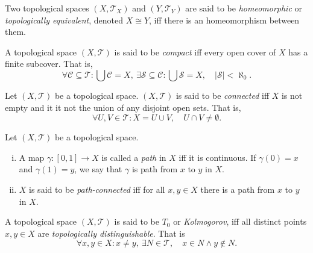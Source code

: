 \begin{definition}
	[Homeomorphic]
	\label{def: homomorphisms}
	Two topological spaces $(X, \mathcal T_X)$ and $(Y, \mathcal T_Y)$ are said to be \textit{homeomorphic} or \textit{topologically equivalent}, denoted $X \cong Y$, iff there is an homeomorphism between them.
\end{definition}


\begin{definition}
	[Compactness]
	\label{def: compactness}
	A topological space $(X, \mathcal T)$ is said to be \textit{compact} iff every open cover of $X$ has a finite subcover. That is,
	$$
	\forall \mathcal C \subseteq \mathcal T : \bigcup \mathcal C = X, \ \exists \mathcal S \subseteq \mathcal C : \bigcup \mathcal S = X, \quad |\mathcal S| < \aleph_0.
	$$
\end{definition}


\begin{definition}
	[Connectedness]
	\label{def: connectedness}
	Let $(X, \mathcal T)$ be a topological space. $(X, \mathcal T)$ is said to be \textit{connected} iff $X$ is not empty and it it not the union of any disjoint open sets. That is,
	$$
	\forall U, V \in \mathcal T : X = U \cup V, \quad U \cap V \ne \emptyset.
	$$
\end{definition}


\begin{definition}
	\label{def: path-connectedness}
	Let $(X, \mathcal T)$ be a topological space.
	\begin{enumerate}[(i)]
		\item A map $\gamma: [0,1] \to X$ is called a \textit{path} in $X$ iff it is continuous. If $\gamma(0) = x$ and $\gamma(1)=y$, we say that $\gamma$ is path from $x$ to $y$ in $X$.
		\item $X$ is said to be \textit{path-connected} iff for all $x, y \in X$ there is a path from $x$ to $y$ in $X$.
	\end{enumerate}
\end{definition}


\begin{definition}
	[$T_0$ space]
	\label{def: T_1 space}
	A topological space $(X, \mathcal T)$ is said to be $T_0$ or \textit{Kolmogorov}, iff all distinct points $x,y \in X$ are \textit{topologically distinguishable}. That is
	$$
	\forall x,y \in X : x \ne y, \ \exists N \in \mathcal T, \quad x \in N \land y \notin N.
	$$
\end{definition}


